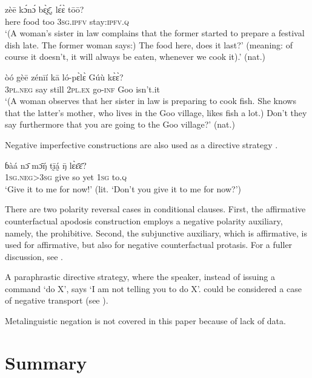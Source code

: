 \documentclass[output=paper,colorlinks,citecolor=brown]{langscibook}
\begin{document}
\ea\label{ex:mano:86}
    \gll zèē kɔ́nɔ́ bɛ̰̀ɛ̰̄, lɛ́ɛ̀ tōō? \\
         here food too \textsc{3sg.ipfv} stay\textsc{:ipfv.q}   \\
    \glt ‘(A woman’s sister in law complains that the former started to prepare a festival dish late. The former woman says:) The food here, does it last?’ (meaning: of course it doesn’t, it will always be eaten, whenever we cook it).’ (nat.)
\z

\ea\label{ex:mano:87}
    \gll òó gèē zénīí kā ló-pɛ̀lɛ̀ Gúù kɛ̀ɛ̀?  \\
     \textsc{3pl.neg} say still 2\textsc{pl.ex} go-\textsc{inf} Goo isn’t.it \\
    \glt ‘(A woman observes that her sister in law is preparing to cook fish. She knows that the latter’s mother, who lives in the Goo village, likes fish a lot.) Don’t they say furthermore that you are going to the Goo village?’ (nat.)
\z

Negative imperfective constructions are also used as a directive strategy .

\ea\label{ex:mano:88}
    \gll ɓàá nɔ̄ mɔ̄ŋ́ tḭ̄á̰ ŋ̄ lɛ̀ɛ̄ɛ̄? \\
         1\textsc{sg.neg>3sg} give so yet \textsc{1sg} to.\textsc{q} \\
    \glt ‘Give it to me for now!’ (lit. ‘Don’t you give it to me for now?’)
\z

There are two polarity reversal cases in conditional clauses. First, the affirmative counterfactual apodosis construction employs a negative polarity auxiliary, namely, the prohibitive. Second, the subjunctive auxiliary, which is affirmative, is used for affirmative, but also for negative counterfactual protasis. For a fuller discussion, see .

A paraphrastic directive strategy, where the speaker, instead of issuing a command ‘do X’, says ‘I am not telling you to do X’. could be considered a case of negative transport (see ).

Metalinguistic negation is not covered in this paper because of lack of data.

\section{Summary}\label{sec:mano:5}
\end{document}

